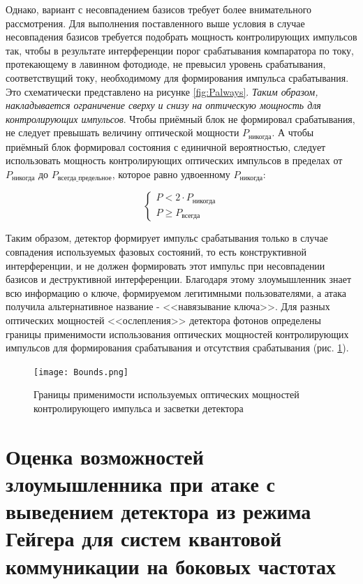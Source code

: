 Однако, вариант с несовпадением базисов требует более внимательного рассмотрения. Для выполнения поставленного выше условия в случае несовпадения базисов требуется подобрать мощность контролирующих импульсов так, чтобы в результате интерференции порог срабатывания компаратора по току, протекающему в лавинном фотодиоде, не превысил уровень срабатывания, соответствущий току, необходимому для формирования импульса срабатывания. Это схематически представлено на рисунке \ref{fig:Palways}. \textit{Таким образом, накладывается ограничение сверху и снизу на оптическую мощность для контролирующих импульсов}. Чтобы приёмный блок не формировал срабатывания, не следует превышать величину оптической мощности $P_\text{никогда}$. А чтобы приёмный блок формировал состояния с единичной вероятностью, следует использовать мощность контролирующих оптических импульсов в пределах от $P_\text{никогда}$ до $P_\text{всегда\_предельное}$, которое равно удвоенному $P_\text{никогда}$:


\[
    \begin{cases}
     P < 2 \cdot P_\text{никогда} \\
     P \geqslant P_\text{всегда}
    \end{cases}
\]




Таким образом, детектор формирует импульс срабатывания только в случае совпадения используемых фазовых состояний, то есть конструктивной интерференции, и не должен формировать этот импульс при несовпадении базисов и деструктивной интерференции. Благодаря этому злоумышленник знает всю информацию о ключе, формируемом легитимными пользователями, а атака получила альтернативное название - <<навязывание ключа>>. Для разных оптических мощностей <<ослепления>> детектора фотонов определены границы применимости использования оптических мощностей контролирующих импульсов для формирования срабатывания и отсутствия срабатывания (рис. \ref{fig:Bounds}).  


 \begin{figure}[ht]
  \centering
  \texttt{[image: Bounds.png]}
  \caption{Границы применимости используемых оптических мощностей контролирующего импульса и засветки детектора}
  \label{fig:Bounds}
\end{figure}


\section{Оценка возможностей злоумышленника при атаке с выведением детектора из режима Гейгера для систем квантовой коммуникации на боковых частотах} \label{ch:ch3/sec3}
 
